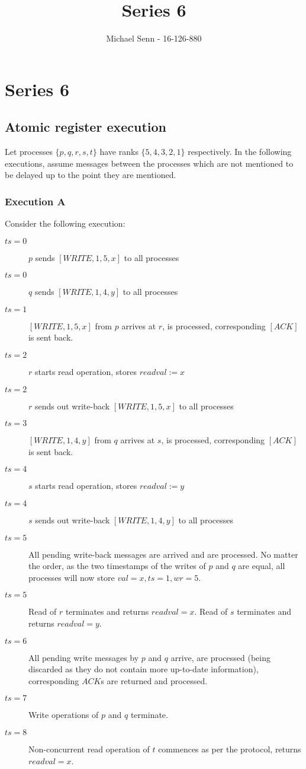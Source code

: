 \documentclass[a4paper]{scrreprt}
\title{Series 6}
\author{Michael Senn \maillink{michael.senn@students.unibe.ch} - 16-126-880}
\date{\printdate}
\begin{document}
\maketitle


\setcounter{chapter}{5}

\chapter{Series 6}

\section{Atomic register execution}

Let processes $\{p, q, r, s, t\}$ have ranks $\{5, 4, 3, 2, 1\}$ respectively.
In the following executions, assume messages between the processes which are not
mentioned to be delayed up to the point they are mentioned.

\subsection{Execution A}

Consider the following execution:

\begin{description}
	\item[$ts = 0$] $p$ sends $[WRITE, 1, 5, x]$ to all processes
	\item[$ts = 0$] $q$ sends $[WRITE, 1, 4, y]$ to all processes
	\item[$ts = 1$] $[WRITE, 1, 5, x]$ from $p$ arrives at $r$, is
		processed, corresponding $[ACK]$ is sent back.
	\item[$ts = 2$] $r$ starts read operation, stores $readval := x$
	\item[$ts = 2$] $r$ sends out write-back $[WRITE, 1, 5, x]$ to all
		processes
	\item[$ts = 3$] $[WRITE, 1, 4, y]$ from $q$ arrives at $s$, is
		processed, corresponding $[ACK]$ is sent back.
	\item[$ts = 4$] $s$ starts read operation, stores $readval := y$
	\item[$ts = 4$] $s$ sends out write-back $[WRITE, 1, 4, y]$ to all
		processes
	\item[$ts = 5$] All pending write-back messages are arrived and are
		processed. No matter the order, as the two timestamps of the
		writes of $p$ and $q$ are equal, all processes will now store
		$val = x, ts = 1, wr = 5$.
	\item[$ts = 5$] Read of $r$ terminates and returns $readval = x$. Read
		of $s$ terminates and returns $readval = y$.
	\item[$ts = 6$] All pending write messages by $p$ and $q$ arrive, are
		processed (being discarded as they do not contain more
		up-to-date information), corresponding $ACK$s are returned and
		processed.
	\item[$ts = 7$] Write operations of $p$ and $q$ terminate.
	\item[$ts = 8$] Non-concurrent read operation of $t$ commences as per
		the protocol, returns $readval = x$.
\end{description}
\end{document}
